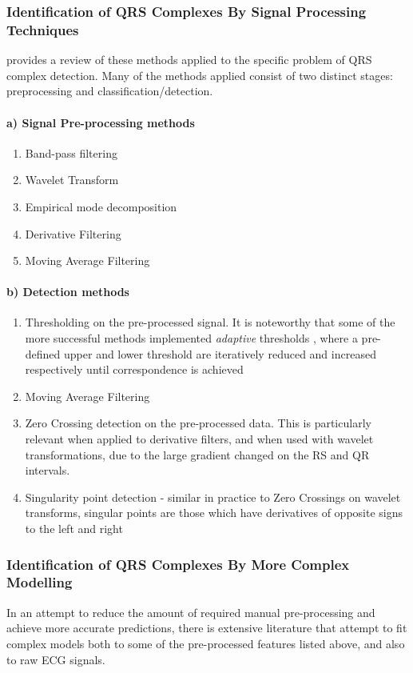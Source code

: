 \documentclass[9pt,conference]{IEEEtran}
\begin{document}
\subsubsection{Identification of QRS Complexes By Signal Processing Techniques}

\cite{ecgReview} provides a review of these methods applied to the specific problem of QRS complex detection. Many of the methods applied consist of two distinct stages: preprocessing and  classification/detection.

\paragraph*{a) \textbf{Signal Pre-processing methods}}
\begin{enumerate}
    \item Band-pass filtering
    \item Wavelet Transform
    \item Empirical mode decomposition
    \item Derivative Filtering
    \item Moving Average Filtering
\end{enumerate}

\paragraph*{b) \textbf{Detection methods}}
\begin{enumerate}
    \item Thresholding on the pre-processed signal. It is noteworthy that some of the more successful methods implemented \textit{adaptive} thresholds \cite{adaptThresh}, where a pre-defined upper and lower threshold are iteratively reduced and increased respectively until correspondence is achieved
    \item Moving Average Filtering
    \item Zero Crossing detection on the pre-processed data. This is particularly relevant when applied to derivative filters, and when used with wavelet transformations, due to the large gradient changed on the RS and QR intervals.
    \item Singularity point detection - similar in practice to Zero Crossings on wavelet transforms, singular points are those which have derivatives of opposite signs to the left and right \cite{singularECG}  
\end{enumerate}


\subsubsection{Identification of QRS Complexes By More Complex Modelling}
In an attempt to reduce the amount of required manual pre-processing and achieve more accurate predictions, there is extensive literature \cite{ecgReview}\cite{KAPLANBERKAYA2018216} that attempt to fit complex models both to some of the pre-processed features listed above, and also to raw ECG signals.
\end{document}
